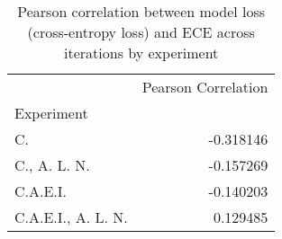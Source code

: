 \begin{table}
\centering
\caption{Pearson correlation between model loss (cross-entropy loss) and ECE across iterations by experiment}
\label{tbl:loss_ECE_evolution_corr_by_experiment}
\begin{tabular}{lr}
\toprule
{} &  Pearson Correlation \\
Experiment         &                      \\
\midrule
C.                 &            -0.318146 \\
C., A. L. N.       &            -0.157269 \\
C.A.E.I.           &            -0.140203 \\
C.A.E.I., A. L. N. &             0.129485 \\
\bottomrule
\end{tabular}
\end{table}
